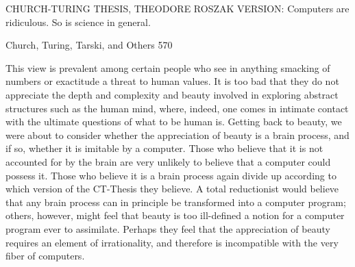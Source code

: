 {CHURCH-TURING THESIS, THEODORE ROSZAK VERSION: Computers are
    ridiculous. So is science in general.



Church, Turing, Tarski, and Others                                                         570

This view is prevalent among certain people who see in anything smacking of numbers or
exactitude a threat to human values. It is too bad that they do not appreciate the depth and
complexity and beauty involved in exploring abstract structures such as the human mind,
where, indeed, one comes in intimate contact with the ultimate questions of what to be
human is.
        Getting back to beauty, we were about to consider whether the appreciation of
beauty is a brain process, and if so, whether it is imitable by a computer. Those who
believe that it is not accounted for by the brain are very unlikely to believe that a
computer could possess it. Those who believe it is a brain process again divide up
according to which version of the CT-Thesis they believe. A total reductionist would
believe that any brain process can in principle be transformed into a computer program;
others, however, might feel that beauty is too ill-defined a notion for a computer program
ever to assimilate. Perhaps they feel that the appreciation of beauty requires an element of
irrationality, and therefore is incompatible with the very fiber of computers.

}
